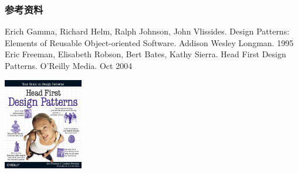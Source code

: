 \documentclass[compress]{beamer}
\begin{document}
\begin{frame}
\frametitle{参考资料}
\begin{thebibliography}{}
   Erich Gamma, Richard Helm, Ralph Johnson, John Vlissides. Design
   Patterns: Elements of Reusable Object-oriented Software. Addison
   Wesley Longman. 1995 
   Eric Freeman, Elisabeth Robson, Bert Bates, Kathy Sierra. Head First Design Patterns. O'Reilly Media. Oct 2004 
\end{thebibliography}

\begin{center}
  \centering\includegraphics[height=4cm]{headfirstdpcover.pdf}
\end{center}

\end{frame}
\end{document}
